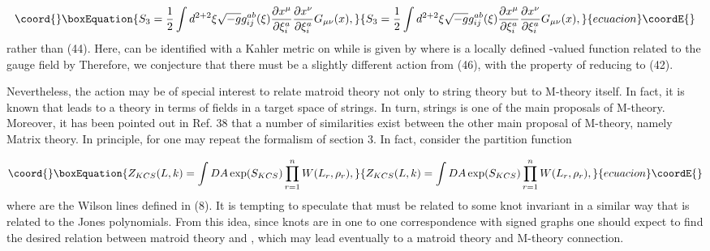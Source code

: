 \documentclass[a4paper,12pt]{article}
\begin{document}
\begin{equation}\coord{}\boxEquation{
S_{3}=\frac{1}{2}\int d^{2+2}\xi \sqrt{-g}g_{ij}^{ab}(\xi )\frac{\partial
x^{\mu }}{\partial \xi _{i}^{a}}\frac{\partial x^{\nu }}{\partial \xi
_{i}^{a}}G_{\mu \nu }(x),  \label{47}
}{
S_{3}=\frac{1}{2}\int d^{2+2}\xi \sqrt{-g}g_{ij}^{ab}(\xi )\frac{\partial
x^{\mu }}{\partial \xi _{i}^{a}}\frac{\partial x^{\nu }}{\partial \xi
_{i}^{a}}G_{\mu \nu }(x),  }{ecuacion}\coordE{}\end{equation}
rather than (44). Here, \coordHE{} can be identified with a Kahler metric
on \coordHE{} while \coordHE{} is given by \coordHE{} where \coordHE{} is a locally defined \coordHE{}-valued
function related to the gauge field \coordHE{} by \coordHE{} Therefore, we
conjecture that there must be a slightly different action from (46), with
the property of reducing to (42).

Nevertheless, the action \coordHE{} may be of special interest to relate
matroid theory not only to string theory but to M-theory itself. In fact, it
is known that \coordHE{} leads to a theory in terms of fields in a target
space of \coordHE{} strings.\coordHE{} In turn, \coordHE{} strings is one of the main
proposals of M-theory.\coordHE{} Moreover, it has been pointed out in Ref. 38
that a number of similarities exist between the other main proposal of
M-theory, namely Matrix theory.\coordHE{} In principle, for \coordHE{} one may
repeat the formalism of section 3. In fact, consider the partition function

\begin{equation}\coord{}\boxEquation{
Z_{KCS}(L,k)=\int DA\exp (S_{KCS})\prod\limits_{r=1}^{n}W(L_{r},\rho _{r}),
\label{48}
}{
Z_{KCS}(L,k)=\int DA\exp (S_{KCS})\prod\limits_{r=1}^{n}W(L_{r},\rho _{r}),
}{ecuacion}\coordE{}\end{equation}
where \coordHE{} are the Wilson lines defined in (8). It is
tempting to speculate that \coordHE{} must be related to some knot
invariant in a similar way that \coordHE{} is related to the Jones
polynomials. From this idea, since knots are in one to one correspondence
with signed graphs one should expect to find the desired relation between
matroid theory and \coordHE{}, which may lead eventually to a matroid
theory and M-theory connection.
\end{document}
